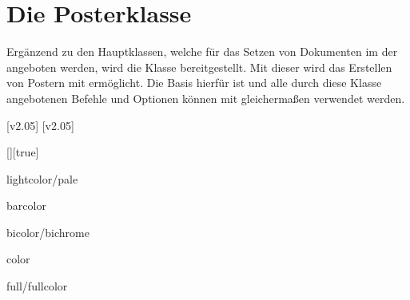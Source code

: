 \chapter[Die Klasse tudscrposter]{Die Posterklasse}
\label{sec:poster}
\begin{Declaration*}{}
Ergänzend zu den Hauptklassen, welche für das Setzen von Dokumenten im \CD der 
\TnUD angeboten werden, wird die Klasse  bereitgestellt. 
Mit dieser wird das Erstellen von Postern mit  ermöglicht. Die 
Basis hierfür ist  und alle durch diese Klasse angebotenen 
Befehle und Optionen können mit  gleichermaßen verwendet 
werden.
\end{Declaration*}

[v2.05]
[v2.05]

\begin{Declaration}[v2.05]{[\PSet]}[true]
\printdeclarationlist%
\begin{values}
\itemfalse
{}
\item[lightcolor/pale]
\item[barcolor]
\item[bicolor/bichrome]
\item[color]
\item[full/fullcolor]
\end{values}
\end{Declaration}



\begin{Declaration}[v2.05]{}
\printdeclarationlist%
\end{Declaration}

